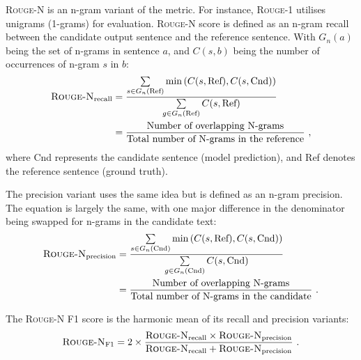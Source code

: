 \documentclass{l4proj}
\begin{document}
\textsc{Rouge-N} is an n-gram variant of the metric. For instance, \textsc{Rouge-1} utilises unigrams (1-grams) for evaluation. \textsc{Rouge-N} score is defined as an n-gram recall between the candidate output sentence and the reference sentence. With $G_n(a)$ being the set of n-grams in sentence $a$, and $C(s, b)$ being the number of occurrences of n-gram $s$ in $b$:
\begin{equation}
\begin{split}    
    \textsc{Rouge-N}_{\text{recall}} &= \frac{\sum\limits_{s \in G_n(\text{Ref})}\min\left( C(s, \text{Ref}), C(s, \text{Cnd})\right)}{\sum\limits_{g \in G_n(\text{Ref})}C(s, \text{Ref})} \\
    &= \frac{\text{Number of overlapping N-grams}}{\text{Total number of N-grams in the reference}}\ ,
\end{split}
\end{equation}
where Cnd represents the candidate sentence (model prediction), and Ref denotes the reference sentence (ground truth).

The precision variant uses the same idea but is defined as an n-gram precision. The equation is largely the same, with one major difference in the denominator being swapped for n-grams in the candidate text:
\begin{equation}
\begin{split}    
    \textsc{Rouge-N}_{\text{precision}} &= \frac{\sum\limits_{s \in G_n(\text{Cnd})}\min\left( C(s, \text{Ref}), C(s, \text{Cnd})\right)}{\sum\limits_{g \in G_n(\text{Cnd})}C(s, \text{Cnd})} \\
    &= \frac{\text{Number of overlapping N-grams}}{\text{Total number of N-grams in the candidate}}\ .
\end{split}
\end{equation}

The \textsc{Rouge-N} F1 score is the harmonic mean of its recall and precision variants:
\begin{equation}
    \textsc{Rouge-N}_{\text{F1}} = 2 \times \frac{\textsc{Rouge-N}_{\text{recall}} \times \textsc{Rouge-N}_{\text{precision}}}{\textsc{Rouge-N}_\text{recall} + \textsc{Rouge-N}_\text{precision}}\ .
\end{equation}
\end{document}
